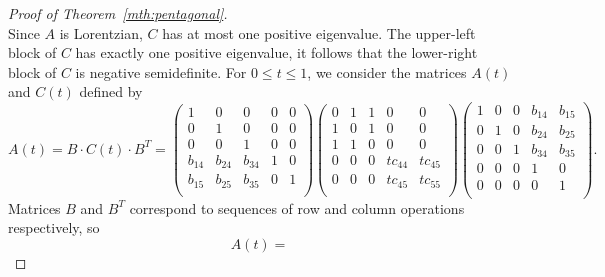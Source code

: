 \documentclass{amsart}
\theoremstyle{definition}
\theoremstyle{remark}
\begin{document}
\begin{proof}[Proof of Theorem~\ref{mth:pentagonal}]
\[\]
Since $A$ is Lorentzian, $C$ has at most one positive eigenvalue. The upper-left block of $C$ has exactly one positive eigenvalue, it follows that the lower-right block of $C$ is negative semidefinite.
For $0 \le t \le 1$, we consider the matrices $A(t)$ and $C(t)$ defined by
\[
A(t)=B\cdot C(t)\cdot B^{T}=\begin{pmatrix}
1 & 0 & 0 & 0 & 0 \\
0 & 1 & 0 & 0 & 0 \\
0 & 0 & 1 & 0 & 0 \\
b_{14} & b_{24} & b_{34} & 1 & 0 \\
b_{15} & b_{25} & b_{35} & 0 & 1 \\
\end{pmatrix}
\begin{pmatrix}
0 & 1 & 1 & 0 & 0 \\
1 & 0 & 1 & 0 & 0 \\
1 & 1 & 0 & 0 & 0\\
0 & 0 & 0 & tc_{44} & tc_{45} \\
0 & 0 & 0 & tc_{45} & tc_{55} \\
\end{pmatrix}
\begin{pmatrix}
1 & 0 & 0 & b_{14} & b_{15} \\
0 & 1 & 0 & b_{24} & b_{25} \\
0 & 0 & 1 & b_{34} & b_{35} \\
0 & 0 & 0 & 1 & 0 \\
0 & 0 & 0 & 0 & 1 \\
\end{pmatrix}.
\]
Matrices $B$ and $B^{T}$ correspond to sequences of row and column operations respectively, so 
\[
A(t)=
\]
\end{proof}
\end{document}
